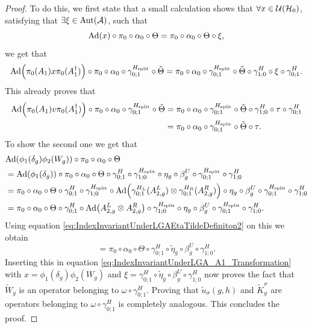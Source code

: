 \documentclass[11pt,a4paper,twoside]{article}
\numberwithin{equation}{section}
\begin{document}
	\begin{proof}
		To do this, we first state that a small calculation shows that $\forall x\in\mathcal U(\mathcal H_0)$, satisfying that $\exists\xi\in\Aut{\AA}$, such that
		\begin{equation}
			\Ad{x}\circ\pi_0\circ\alpha_0\circ\Theta=\pi_0\circ\alpha_0\circ\Theta\circ\xi,
		\end{equation}
		we get that
		\begin{equation}\label{eq:IndexInvariantUnderLGA_A1_Transformation}
			\Ad{\pi_0(A_1)x\pi_0(A_1^\dagger)}\circ\pi_0\circ\alpha_0\circ\gamma^{\Hsplit}_{0;1}\circ\tilde{\Theta}=\pi_0\circ\alpha_0\circ\gamma^{\Hsplit}_{0;1}\circ\tilde{\Theta}\circ\gamma^H_{1;0}\circ\xi\circ\gamma^H_{0;1}.
		\end{equation}
		This already proves that
		\begin{align}
			\Ad{\pi_0(A_1)v\pi_0(A_1^\dagger)}\circ\pi_0\circ\alpha_0\circ\gamma^{\Hsplit}_{0;1}\circ\tilde{\Theta}&=\pi_0\circ\alpha_0\circ\gamma^{\Hsplit}_{0;1}\circ\tilde{\Theta}\circ\gamma^H_{1;0}\circ\tau\circ\gamma^H_{0;1}\\
			&=\pi_0\circ\alpha_0\circ\gamma^{\Hsplit}_{0;1}\circ\tilde{\Theta}\circ\tau.
		\end{align}
		To show the second one we get that
		\begin{align}
			&\Ad{\phi_1(\delta_g)\phi_2(W_g)}\circ\pi_0\circ\alpha_0\circ\Theta\\
			&=\Ad{\phi_1(\delta_g)}\circ\pi_0\circ\alpha_0\circ\Theta\circ\gamma^{H}_{0;1}\circ\gamma^{\Hsplit}_{1;0}\circ\eta_g\circ\beta_g^U\circ\gamma^{\Hsplit}_{0;1}\circ\gamma^H_{1;0}\\
			&=\pi_0\circ\alpha_0\circ\Theta\circ\gamma^{H}_{0;1}\circ\gamma^{\Hsplit}_{1;0}\circ\Ad{\gamma^{H_L}_{0;1}(A_{2,g}^L)\otimes\gamma^{H_R}_{0;1}(A_{2,g}^R)}\circ\eta_g\circ\beta_g^U\circ\gamma^{\Hsplit}_{0;1}\circ\gamma^H_{1;0}\\
			&=\pi_0\circ\alpha_0\circ\Theta\circ\gamma^{H}_{0;1}\circ\Ad{A_{2,g}^L\otimes A_{2,g}^R}\circ\gamma^{\Hsplit}_{1;0}\circ\eta_g\circ\beta_g^U\circ\gamma^{\Hsplit}_{0;1}\circ\gamma^H_{1;0}.
		\end{align}
		Using equation \eqref{eq:IndexInvariantUnderLGAEtaTildeDefiniton2} on this we obtain
		\begin{equation}
			=\pi_0\circ\alpha_0\circ\Theta\circ\gamma^H_{0;1}\circ\tilde{\eta}_g\circ\beta_g^U\circ\gamma^H_{1;0}.
		\end{equation}
		Inserting this in equation \eqref{eq:IndexInvariantUnderLGA_A1_Transformation} with $x=\phi_1(\delta_g)\phi_2(W_g)$ and $\xi=\gamma^H_{0;1}\circ\tilde{\eta}_g\circ\beta_g^U\circ\gamma^H_{1;0}$ now proves the fact that $\tilde{W}_g$ is an operator belonging to $\omega\circ\gamma^H_{0;1}$. Proving that $\tilde u_\sigma(g,h)$ and $\tilde{K}_g^\sigma$ are operators belonging to $\omega\circ\gamma_{0;1}^H$ is completely analogous. This concludes the proof.
	\end{proof}
\end{document}
